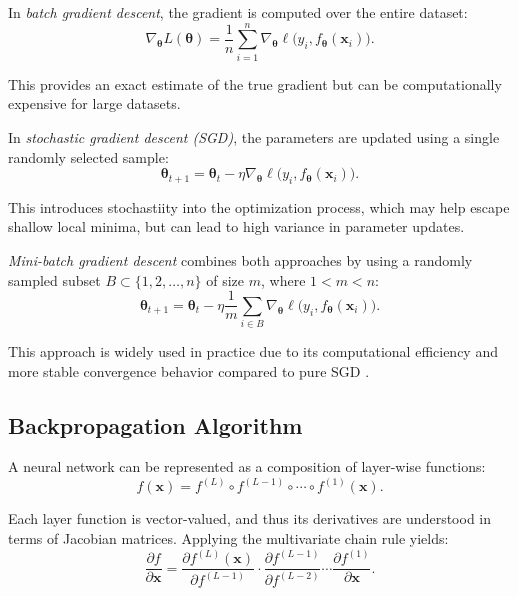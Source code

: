 In \emph{batch gradient descent}, the gradient is computed over the entire dataset:
\begin{equation*}
\nabla_{\boldsymbol{\theta}} L(\boldsymbol{\theta}) = \frac{1}{n} \sum_{i=1}^{n} \nabla_{\boldsymbol{\theta}} \ell\bigl(y_i, f_{\boldsymbol{\theta}}(\mathbf{x}_i)\bigr).
\end{equation*}

This provides an exact estimate of the true gradient but can be computationally expensive for large datasets.

In \emph{stochastic gradient descent (SGD)}, the parameters are updated using a single randomly selected sample:
\begin{equation*}
\boldsymbol{\theta}_{t+1} = \boldsymbol{\theta}_t - \eta \nabla_{\boldsymbol{\theta}} \ell\bigl(y_i, f_{\boldsymbol{\theta}}(\mathbf{x}_i)\bigr).
\end{equation*}

This introduces stochastiity into the optimization process, which may help escape shallow local minima, but can lead to high variance in parameter updates.

\emph{Mini-batch gradient descent} combines both approaches by using a randomly sampled subset $B \subset \{1,2,\dots,n\}$ of size $m$, where $1 < m < n$:
\begin{equation*}
\boldsymbol{\theta}_{t+1} = \boldsymbol{\theta}_t - \eta \frac{1}{m} \sum_{i \in B} \nabla_{\boldsymbol{\theta}} \ell\bigl(y_i, f_{\boldsymbol{\theta}}(\mathbf{x}_i)\bigr).
\end{equation*}

This approach is widely used in practice due to its computational efficiency and more stable convergence behavior compared to pure SGD \cite{gfg2025}.

\subsection{Backpropagation Algorithm}
\label{subsec:backpropagation}
A neural network can be represented as a composition of layer-wise functions:
\begin{equation*}
    f(\mathbf{x}) = f^{(L)} \circ f^{(L-1)} \circ \cdots \circ f^{(1)}(\mathbf{x}).
\end{equation*}

Each layer function is vector-valued, and thus its derivatives are understood in terms of Jacobian matrices. Applying the multivariate chain rule yields:
\begin{equation*}
\frac{\partial f}{\partial \mathbf{x}}
=
\frac{\partial f^{(L)}(\mathbf{x})}{\partial f^{(L-1)}}
\cdot
\frac{\partial f^{(L-1)}}{\partial f^{(L-2)}}
\cdots
\frac{\partial f^{(1)}}{\partial \mathbf{x}}.
\end{equation*}

